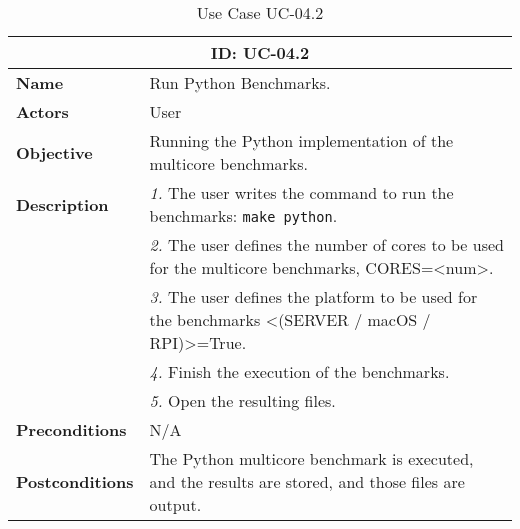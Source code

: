 \begin{table}[H]
    \centering
    \begin{tabular}{l p{10cm}}
        \toprule
        \multicolumn{2}{c}{\textbf{ID: UC-04.2}} \\
        \toprule
        \textbf{Name}                         &  Run Python Benchmarks. \\
        \textbf{Actors}                       &  User \\
        \textbf{Objective}                    &  Running the Python implementation of the multicore benchmarks. \\
        \multirow{1}{*}{\textbf{Description}} & \textsl{1.} The user writes the command to run the benchmarks: \texttt{make python}.\\
                                              & \textsl{2.} The user defines the number of cores to be used for the multicore benchmarks, CORES=<num>.\\
                                              & \textsl{3.} The user defines the platform to be used for the benchmarks <(SERVER / macOS / RPI)>=True.\\
                                              & \textsl{4.} Finish the execution of the benchmarks.\\
                                              & \textsl{5.} Open the resulting files.\\ 
        \textbf{Preconditions}                &  N/A \\
        \textbf{Postconditions}               &  The Python multicore benchmark is executed, and the results are stored, and those files are output. \\
    \end{tabular}
    \caption{Use Case UC-04.2}
    \label{tab:uc-04.2}
\end{table}


